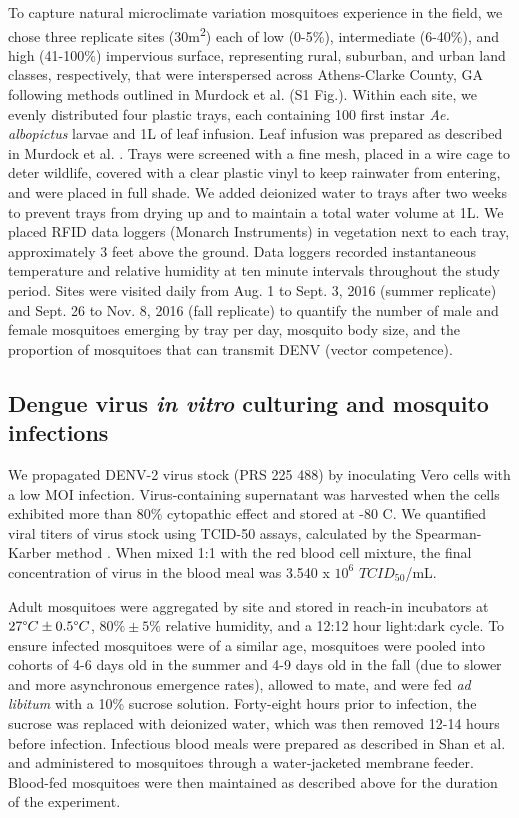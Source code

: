 \documentclass[12pt]{article}
\begin{document}
To capture natural microclimate variation mosquitoes experience in the field, we chose three replicate sites (30m\textsuperscript{2}) each of low (0-5\%), intermediate (6-40\%), and high (41-100\%) impervious surface, representing rural, suburban, and urban land classes, respectively, that were interspersed across Athens-Clarke County, GA following methods outlined in Murdock et al. \citep{murdock2017} (S1 Fig.). Within each site, we evenly distributed four plastic trays, each containing 100 first instar \textit{Ae. albopictus} larvae and 1L of leaf infusion. Leaf infusion was prepared as described in Murdock et al. \citep{murdock2017}. Trays were screened with a fine mesh, placed in a wire cage to deter wildlife, covered with a clear plastic vinyl to keep rainwater from entering, and were placed in full shade. We added deionized water to trays after two weeks to prevent trays from drying up and to maintain a total water volume at 1L. We placed RFID data loggers (Monarch Instruments) in vegetation next to each tray, approximately 3 feet above the ground. Data loggers recorded instantaneous temperature and relative humidity at ten minute intervals throughout the study period. Sites were visited daily from Aug. 1 to Sept. 3, 2016 (summer replicate) and Sept. 26 to Nov. 8, 2016 (fall replicate) to quantify the number of male and female mosquitoes emerging by tray per day, mosquito body size, and the proportion of mosquitoes that can transmit DENV (vector competence).

\subsection{Dengue virus \textit{in vitro} culturing and mosquito infections}
We propagated DENV-2 virus stock (PRS 225 488) by inoculating Vero cells with a low MOI infection. Virus-containing supernatant was harvested when the cells exhibited more than 80\% cytopathic effect and stored at -80 \degree C. We quantified viral titers of virus stock using TCID-50 assays, calculated by the Spearman-Karber method \citep{shao2016}. When mixed 1:1 with the red blood cell mixture, the final concentration of virus in the blood meal was 3.540 x $10^6$ $TCID_{50}$/mL.

Adult mosquitoes were aggregated by site and stored in reach-in incubators at $27 \degree C \pm 0.5 \degree C$, $80\% \pm 5\%$ relative humidity, and a 12:12 hour light:dark cycle. To ensure infected mosquitoes were of a similar age, mosquitoes were pooled into cohorts of 4-6 days old in the summer and 4-9 days old in the fall (due to slower and more asynchronous emergence rates), allowed to mate, and were fed \textit{ad libitum} with a 10\% sucrose solution. Forty-eight hours prior to infection, the sucrose was replaced with deionized water, which was then removed 12-14 hours before infection. Infectious blood meals were prepared as described in Shan et al. \citep{shan2016} and administered to mosquitoes through a water-jacketed membrane feeder. Blood-fed mosquitoes were then maintained as described above for the duration of the experiment.
\end{document}
